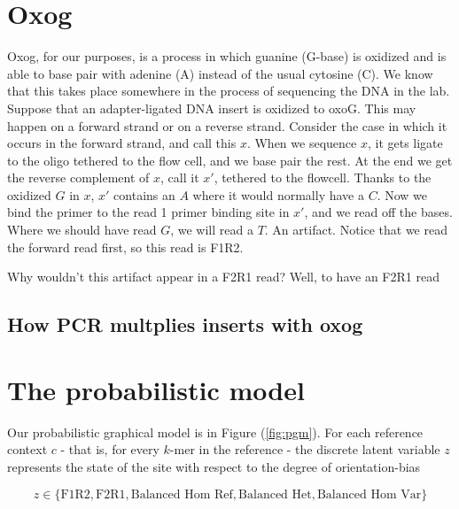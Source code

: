 \documentclass[a4paper]{article}
\begin{document}
\section{Oxog}

Oxog, for our purposes, is a process in which guanine (G-base) is oxidized and is able to base pair with adenine (A) instead of the usual cytosine (C). We know that this takes place somewhere in the process of sequencing the DNA in the lab. Suppose that an adapter-ligated DNA insert is oxidized to oxoG. This may happen on a forward strand or on a reverse strand. Consider the case in which it occurs in the forward strand, and call this $x$. When we sequence $x$, it gets ligate to the oligo tethered to the flow cell, and we base pair the rest. At the end we get the reverse complement of $x$, call it $x'$, tethered to the flowcell. Thanks to the oxidized $G$ in $x$, $x'$ contains an $A$ where it would normally have a $C$. Now we bind the primer to the read 1 primer binding site in $x'$, and we read off the bases. Where we should have read $G$, we will read a $T$. An artifact. Notice that we read the forward read first, so this read is F1R2.

Why wouldn't this artifact appear in a F2R1 read? Well, to have an F2R1 read

\subsection{How PCR multplies inserts with oxog}


\section{The probabilistic model}

Our probabilistic graphical model is in Figure (\ref{fig:pgm}). For each reference context $c$ - that is, for every $k$-mer in the reference - the discrete latent variable $z$ represents the state of the site with respect to the degree of orientation-bias 

\begin{equation*}
z \in \{ \text{F1R2}, \text{F2R1}, \text{Balanced Hom Ref}, \text{Balanced Het}, \text{Balanced Hom Var} \}
\end{equation*}
\end{document}
